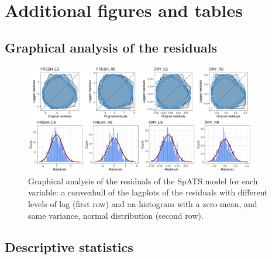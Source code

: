 

\clearpage

\chapter{Additional figures and tables}
\section{Graphical analysis of the residuals}
\label{appendix:residuals}

\begin{figure}
	\includegraphics[width = 0.9\textwidth]{../../Figures/residuals_analysis_plot.pdf}
	\caption[Graphical analysis of the residuals og the SpATS model]{Graphical analysis of the residuals of the SpATS model for each variable: a convexhull of the lagplots of the residuals with different levels of lag (first row) and an histogram with a zero-mean, and same variance, normal distribution (second row).}
	\label{fig:residuals_analysis_plot}
\end{figure}

\section{Descriptive statistics}
\label{appendix:mean_std_table}

